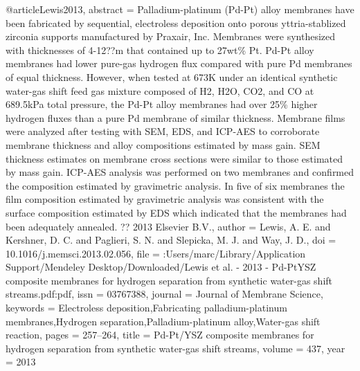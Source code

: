 @article{Lewis2013,
abstract = {Palladium-platinum (Pd-Pt) alloy membranes have been fabricated by sequential, electroless deposition onto porous yttria-stablized zirconia supports manufactured by Praxair, Inc. Membranes were synthesized with thicknesses of 4-12??m that contained up to 27wt{\%} Pt. Pd-Pt alloy membranes had lower pure-gas hydrogen flux compared with pure Pd membranes of equal thickness. However, when tested at 673K under an identical synthetic water-gas shift feed gas mixture composed of H2, H2O, CO2, and CO at 689.5kPa total pressure, the Pd-Pt alloy membranes had over 25{\%} higher hydrogen fluxes than a pure Pd membrane of similar thickness. Membrane films were analyzed after testing with SEM, EDS, and ICP-AES to corroborate membrane thickness and alloy compositions estimated by mass gain. SEM thickness estimates on membrane cross sections were similar to those estimated by mass gain. ICP-AES analysis was performed on two membranes and confirmed the composition estimated by gravimetric analysis. In five of six membranes the film composition estimated by gravimetric analysis was consistent with the surface composition estimated by EDS which indicated that the membranes had been adequately annealed. ?? 2013 Elsevier B.V.},
author = {Lewis, A. E. and Kershner, D. C. and Paglieri, S. N. and Slepicka, M. J. and Way, J. D.},
doi = {10.1016/j.memsci.2013.02.056},
file = {:Users/marc/Library/Application Support/Mendeley Desktop/Downloaded/Lewis et al. - 2013 - Pd-PtYSZ composite membranes for hydrogen separation from synthetic water-gas shift streams.pdf:pdf},
issn = {03767388},
journal = {Journal of Membrane Science},
keywords = {Electroless deposition,Fabricating palladium-platinum membranes,Hydrogen separation,Palladium-platinum alloy,Water-gas shift reaction},
pages = {257--264},
title = {{Pd-Pt/YSZ composite membranes for hydrogen separation from synthetic water-gas shift streams}},
volume = {437},
year = {2013}
}

